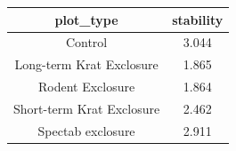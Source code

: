 \documentclass[]{article}
\begin{document}
\begin{longtable}[c]{@{}cc@{}}
\toprule
\begin{minipage}[b]{0.34\columnwidth}\centering\strut
plot\_type
\strut\end{minipage} &
\begin{minipage}[b]{0.14\columnwidth}\centering\strut
stability
\strut\end{minipage}\tabularnewline
\midrule
\endhead
\begin{minipage}[t]{0.34\columnwidth}\centering\strut
Control
\strut\end{minipage} &
\begin{minipage}[t]{0.14\columnwidth}\centering\strut
3.044
\strut\end{minipage}\tabularnewline
\begin{minipage}[t]{0.34\columnwidth}\centering\strut
Long-term Krat Exclosure
\strut\end{minipage} &
\begin{minipage}[t]{0.14\columnwidth}\centering\strut
1.865
\strut\end{minipage}\tabularnewline
\begin{minipage}[t]{0.34\columnwidth}\centering\strut
Rodent Exclosure
\strut\end{minipage} &
\begin{minipage}[t]{0.14\columnwidth}\centering\strut
1.864
\strut\end{minipage}\tabularnewline
\begin{minipage}[t]{0.34\columnwidth}\centering\strut
Short-term Krat Exclosure
\strut\end{minipage} &
\begin{minipage}[t]{0.14\columnwidth}\centering\strut
2.462
\strut\end{minipage}\tabularnewline
\begin{minipage}[t]{0.34\columnwidth}\centering\strut
Spectab exclosure
\strut\end{minipage} &
\begin{minipage}[t]{0.14\columnwidth}\centering\strut
2.911
\strut\end{minipage}\tabularnewline
\bottomrule
\end{longtable}
\end{document}
